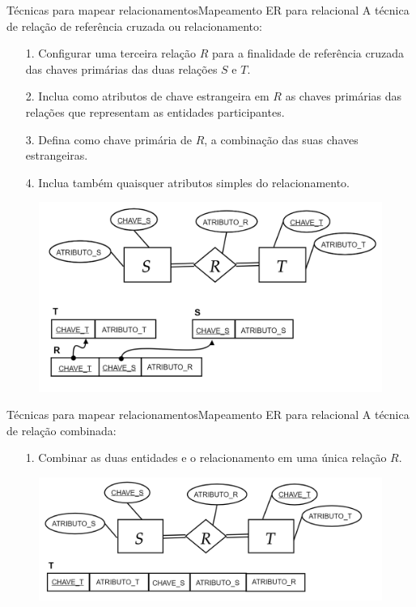 \documentclass[t]{beamer}
\begin{document}
\begin{ftst}{Técnicas para mapear relacionamentos}{Mapeamento ER para relacional}
A técnica de relação de referência cruzada ou relacionamento:
\footnotesize
\begin{itemize}
    \item[1.] Configurar uma terceira relação $R$ para a finalidade de referência cruzada das chaves primárias das duas relações $S$ e $T$.
    \item[2.] Inclua como atributos de chave estrangeira em $R$ as chaves primárias das relações que representam as entidades participantes.
    \item[3.] Defina como chave primária de $R$, a combinação das suas chaves estrangeiras.
    \item[4.] Inclua também quaisquer atributos simples do relacionamento.

\end{itemize}
\begin{figure}
    \includegraphics[scale=0.15]{Figuras/03_07.png}
\end{figure}
\end{ftst}


\begin{ftst}{Técnicas para mapear relacionamentos}{Mapeamento ER para relacional}
A técnica de relação combinada:
\footnotesize
\begin{itemize}
    \item[1.] Combinar as duas entidades e o relacionamento em uma única relação $R$.
\end{itemize}
\begin{figure}
    \includegraphics[scale=0.17]{Figuras/03_08.png}
\end{figure}
\end{ftst}
\end{document}

